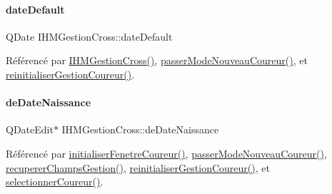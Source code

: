 \mbox{\label{class_i_h_m_gestion_cross_a021706ef369d2bf3b95bcb4a8ecfdbe4}} 
\paragraph{\texorpdfstring{date\+Default}{dateDefault}}
{\footnotesize\ttfamily Q\+Date I\+H\+M\+Gestion\+Cross\+::date\+Default\hspace{0.3cm}{\ttfamily [private]}}



Référencé par \hyperlink{class_i_h_m_gestion_cross_a2c62fd83326a87456a403f46acc408c8}{I\+H\+M\+Gestion\+Cross()}, \hyperlink{class_i_h_m_gestion_cross_ac8f336c95a5f0c9eb8a4bc1c4bb83445}{passer\+Mode\+Nouveau\+Coureur()}, et \hyperlink{class_i_h_m_gestion_cross_a85c44933ec0dcbb591e01c832063367e}{reinitialiser\+Gestion\+Coureur()}.

\mbox{\label{class_i_h_m_gestion_cross_a1c63c5c91be88aef13d2582e48dff7d0}} 
\paragraph{\texorpdfstring{de\+Date\+Naissance}{deDateNaissance}}
{\footnotesize\ttfamily Q\+Date\+Edit$\ast$ I\+H\+M\+Gestion\+Cross\+::de\+Date\+Naissance\hspace{0.3cm}{\ttfamily [private]}}



Référencé par \hyperlink{class_i_h_m_gestion_cross_aa5d9de499a66e52b843c4ef4c6074a60}{initialiser\+Fenetre\+Coureur()}, \hyperlink{class_i_h_m_gestion_cross_ac8f336c95a5f0c9eb8a4bc1c4bb83445}{passer\+Mode\+Nouveau\+Coureur()}, \hyperlink{class_i_h_m_gestion_cross_a271efe8d31fbe05fccfb2dc81e71971a}{recuperer\+Champs\+Gestion()}, \hyperlink{class_i_h_m_gestion_cross_a85c44933ec0dcbb591e01c832063367e}{reinitialiser\+Gestion\+Coureur()}, et \hyperlink{class_i_h_m_gestion_cross_ad71963d500fd61995fdae94e833db163}{selectionner\+Coureur()}.

\mbox{\label{class_i_h_m_gestion_cross_a5da4390d71dbd5d05cff339f93c7c85a}} 
